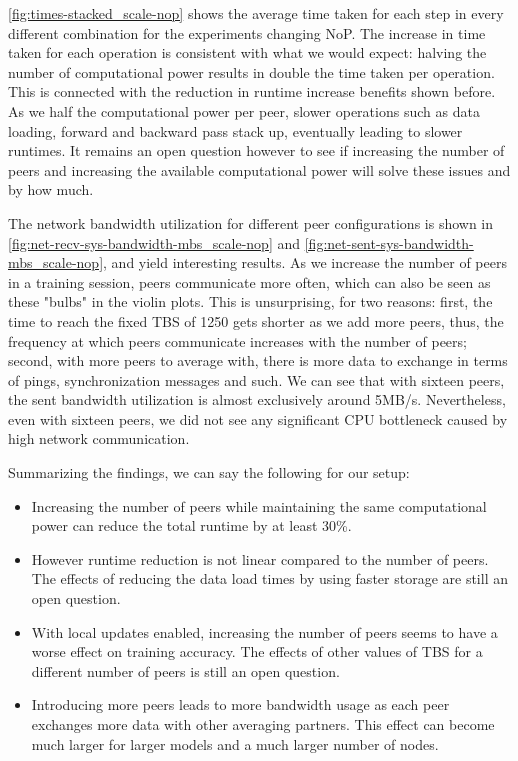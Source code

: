 \autoref{fig:times-stacked_scale-nop} shows the average time taken for each step in every different combination for the experiments changing NoP.
The increase in time taken for each operation is consistent with what we would expect: halving the number of computational power results in double the time taken per operation.
This is connected with the reduction in runtime increase benefits shown before.
As we half the computational power per peer, slower operations such as data loading, forward and backward pass stack up, eventually leading to slower runtimes.
It remains an open question however to see if increasing the number of peers and increasing the available computational power will solve these issues and by how much.

The network bandwidth utilization for different peer configurations is shown in \autoref{fig:net-recv-sys-bandwidth-mbs_scale-nop} and \autoref{fig:net-sent-sys-bandwidth-mbs_scale-nop}, and yield interesting results.
As we increase the number of peers in a training session, peers communicate more often, which can also be seen as these "bulbs" in the violin plots.
This is unsurprising, for two reasons:
first, the time to reach the fixed TBS of 1250 gets shorter as we add more peers, thus, the frequency at which peers communicate increases with the number of peers;
second, with more peers to average with, there is more data to exchange in terms of pings, synchronization messages and such.
We can see that with sixteen peers, the sent bandwidth utilization is almost exclusively around 5MB/s.
Nevertheless, even with sixteen peers, we did not see any significant CPU bottleneck caused by high network communication.

Summarizing the findings, we can say the following for our setup:
\begin{itemize}
    \item Increasing the number of peers while maintaining the same computational power can reduce the total runtime by at least 30\%.
    \item However runtime reduction is not linear compared to the number of peers.
          The effects of reducing the data load times by using faster storage are still an open question.
    \item With local updates enabled, increasing the number of peers seems to have a worse effect on training accuracy.
          The effects of other values of TBS for a different number of peers is still an open question.
    \item Introducing more peers leads to more bandwidth usage as each peer exchanges more data with other averaging partners.
          This effect can become much larger for larger models and a much larger number of nodes.
\end{itemize}%

